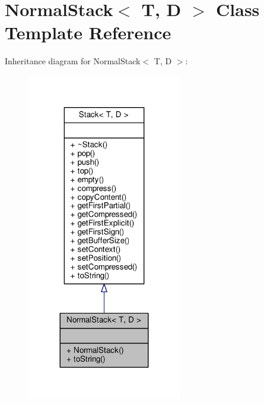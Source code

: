 \hypertarget{class_normal_stack}{}\section{Normal\+Stack$<$ T, D $>$ Class Template Reference}
\label{class_normal_stack}


Inheritance diagram for Normal\+Stack$<$ T, D $>$\+:
\nopagebreak
\begin{figure}[H]
\begin{center}
\leavevmode
\includegraphics[width=191pt]{class_normal_stack__inherit__graph}
\end{center}
\end{figure}


